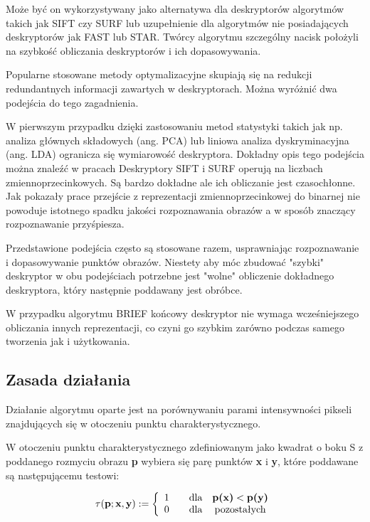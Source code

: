 Może być on wykorzystywany jako alternatywa dla deskryptorów algorytmów takich jak SIFT czy SURF lub uzupełnienie dla algorytmów nie posiadających deskryptorów jak FAST lub STAR. Twórcy algorytmu szczególny nacisk położyli na szybkość obliczania deskryptorów i ich dopasowywania. 


Popularne stosowane metody optymalizacyjne skupiają się na redukcji redundantnych informacji zawartych w deskryptorach. Można wyróżnić dwa podejścia do tego zagadnienia.

W pierwszym przypadku dzięki zastosowaniu metod statystyki takich jak np. analiza głównych składowych (ang. PCA) lub liniowa analiza dyskryminacyjna (ang. LDA) ogranicza się wymiarowość deskryptora. Dokładny opis tego podejścia można znaleźć w pracach  Deskryptory SIFT i SURF operują na liczbach zmiennoprzecinkowych. Są bardzo dokładne ale ich obliczanie jest czasochłonne. Jak pokazały prace \cite{B-ref1}\cite{B-ref2} \cite{B-ref3} przejście z reprezentacji zmiennoprzecinkowej do binarnej nie powoduje istotnego spadku jakości rozpoznawania obrazów a w sposób znaczący rozpoznawanie przyśpiesza. 


Przedstawione podejścia często są stosowane razem, usprawniając rozpoznawanie i dopasowywanie punktów obrazów. Niestety aby móc zbudować "szybki" deskryptor w obu podejściach potrzebne jest "wolne" obliczenie dokładnego deskryptora, który następnie poddawany jest obróbce. 

W przypadku algorytmu BRIEF końcowy deskryptor nie wymaga wcześniejszego obliczania innych reprezentacji, co czyni go szybkim zarówno podczas samego tworzenia jak i użytkowania.



\subsection{Zasada działania}

Działanie algorytmu oparte jest na porównywaniu parami intensywności pikseli znajdujących się w otoczeniu punktu charakterystycznego. 

W otoczeniu punktu charakterystycznego zdefiniowanym jako kwadrat o boku S z poddanego rozmyciu obrazu \textbf{p} wybiera się parę punktów \textbf{x} i \textbf{y}, które poddawane są następującemu testowi:

\begin{equation}
\tau(\textbf{p};\textbf{x},\textbf{y}) := \left\lbrace \begin{array}{cccc}
1 & & $dla$ & \textbf{p(x)}< \textbf{p(y)}\\
0 & & $dla$ & $pozostałych$
\end{array}
\right.
\label{eqn:brief_test}
\end{equation}

